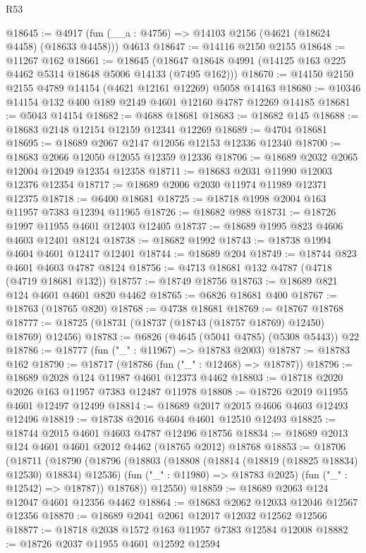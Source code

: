 \begin{lexlean}{R53}
\begin{coremodule}
@18645 := @4917 (fun (__a : @4756) => @14103 @2156 (@4621 (@18624 @4458) (@18633 @4458))) @4613
@18647 := @14116 @2150 @2155
@18648 := @11267 @162
@18661 := @18645
    (@18647 @18648 @4991 (@14125 @163 @225 @4462 @5314 @18648 @5006 @14133 (@7495 @162)))
@18670 := @14150 @2150 @2155 @4789 @14154 (@4621 @12161 @12269) @5058 @14163
@18680 := @10346 @14154 @132 @400 @189 @2149 @4601 @12160 @4787 @12269 @14185
@18681 := @5043 @14154
@18682 := @4688 @18681
@18683 := @18682 @145
@18688 := @18683 @2148 @12154 @12159 @12341 @12269
@18689 := @4704 @18681
@18695 := @18689 @2067 @2147 @12056 @12153 @12336 @12340
@18700 := @18683 @2066 @12050 @12055 @12359 @12336
@18706 := @18689 @2032 @2065 @12004 @12049 @12354 @12358
@18711 := @18683 @2031 @11990 @12003 @12376 @12354
@18717 := @18689 @2006 @2030 @11974 @11989 @12371 @12375
@18718 := @6400 @18681
@18725 := @18718 @1998 @2004 @163 @11957 @7383 @12394 @11965
@18726 := @18682 @988
@18731 := @18726 @1997 @11955 @4601 @12403 @12405
@18737 := @18689 @1995 @823 @4606 @4603 @12401 @8124
@18738 := @18682 @1992
@18743 := @18738 @1994 @4604 @4601 @12417 @12401
@18744 := @18689 @204
@18749 := @18744 @823 @4601 @4603 @4787 @8124
@18756 := @4713 @18681 @132 @4787 (@4718 (@4719 @18681 @132))
@18757 := @18749 @18756
@18763 := @18689 @821 @124 @4601 @4601 @820 @4462
@18765 := @6826 @18681 @400
@18767 := @18763 (@18765 @820)
@18768 := @4738 @18681
@18769 := @18767 @18768
@18777 := @18725 (@18731 (@18737 (@18743 (@18757 @18769) @12450) @18769) @12456)
@18783 := @6826 (@4645 (@5041 @4785) (@5308 @5443)) @22
@18786 := @18777 (fun ("_" : @11967) => @18783 @2003)
@18787 := @18783 @162
@18790 := @18717 (@18786 (fun ("_" : @12468) => @18787))
@18796 := @18689 @2028 @124 @11987 @4601 @12373 @4462
@18803 := @18718 @2020 @2026 @163 @11957 @7383 @12487 @11978
@18808 := @18726 @2019 @11955 @4601 @12497 @12499
@18814 := @18689 @2017 @2015 @4606 @4603 @12493 @12496
@18819 := @18738 @2016 @4604 @4601 @12510 @12493
@18825 := @18744 @2015 @4601 @4603 @4787 @12496 @18756
@18834 := @18689 @2013 @124 @4601 @4601 @2012 @4462 (@18765 @2012) @18768
@18853 := @18706
    (@18711
      (@18790
        (@18796
          (@18803
            (@18808 (@18814 (@18819 (@18825 @18834) @12530) @18834) @12536)
            (fun ("_" : @11980) => @18783 @2025)
            (fun ("_" : @12542) => @18787))
          @18768))
      @12550)
@18859 := @18689 @2063 @124 @12047 @4601 @12356 @4462
@18864 := @18683 @2062 @12033 @12046 @12567 @12356
@18870 := @18689 @2041 @2061 @12017 @12032 @12562 @12566
@18877 := @18718 @2038 @1572 @163 @11957 @7383 @12584 @12008
@18882 := @18726 @2037 @11955 @4601 @12592 @12594

\end{coremodule}
\end{lexlean}
